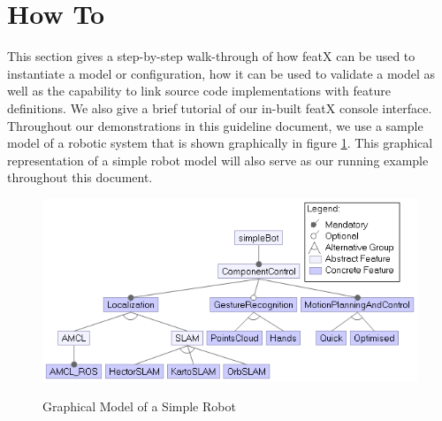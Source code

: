 \documentclass{article}
\begin{document}
\section{How To}
This section gives a step-by-step walk-through of how featX can be used to instantiate a model or configuration, how it can be used to validate a model as well as the capability to link source code implementations with feature definitions. We also give a brief tutorial of our in-built featX console interface. Throughout our demonstrations in this guideline document, we use a sample model of a robotic system that is shown graphically in figure \ref{simplebot}. This graphical representation of a simple robot model will also serve as our running example throughout this document.

\begin{figure}[H]
	\caption{Graphical Model of a Simple Robot}
	\centering
	\includegraphics[width=0.6\columnwidth]{images/simpleBot.png}
	\label{simplebot}
\end{figure}
\end{document}
